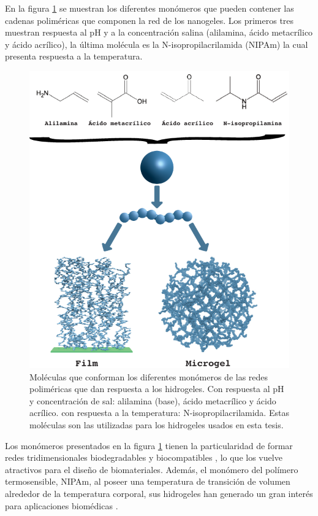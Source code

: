 En la figura \ref{fig:intro:acidos-aa-maa} se muestran los diferentes mon\'omeros que pueden contener las cadenas polim\'ericas que componen la red de los nanogeles. Los primeros tres muestran respuesta al pH y a la concentraci\'on salina (alilamina, \'acido metacr\'ilico y \'acido acr\'ilico), la \'ultima mol\'ecula es la N-isopropilacrilamida (NIPAm) la cual presenta respuesta a la temperatura.


\begin{figure}[!tb]
	\centering
	\includegraphics[width=0.8\linewidth]{Figures/modelos/hidrogeles.pdf}
	\caption{Mol\'eculas  que conforman los diferentes mon\'omeros de las redes polim\'ericas que dan respuesta a los hidrogeles. Con respuesta al pH y concentraci\'on de sal: alilamina (base),  \'acido metacr\'ilico y \'acido acr\'ilico. con respuesta a la temperatura: N-isopropilacrilamida.
		Estas mol\'eculas son las utilizadas para los hidrogeles usados en esta tesis.}
	\label{fig:intro:acidos-aa-maa}
\end{figure}

Los mon\'omeros presentados en la figura \ref{fig:intro:acidos-aa-maa} tienen la particularidad de formar redes tridimensionales biodegradables y biocompatibles \addcite, lo que los vuelve atractivos para el dise\~no de biomateriales.
Adem\'as, el mon\'omero del pol\'imero termosensible, NIPAm, al poseer una temperatura de transici\'on de volumen alrededor de la temperatura corporal, sus hidrogeles han generado un gran inter\'es para aplicaciones biom\'edicas \cite{Guan2011}.

